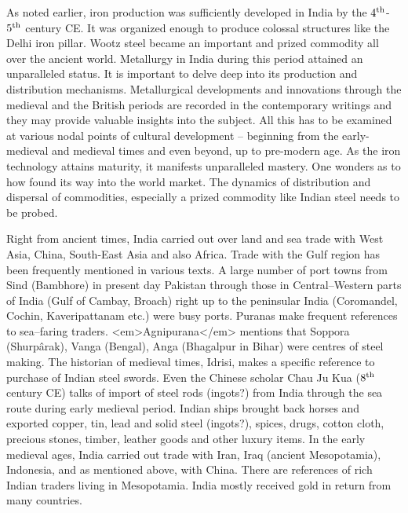As noted earlier, iron production was sufficiently developed in India by the $4^{\rm th}$-$5^{\rm th}$ century CE. It was organized enough to produce colossal structures like the Delhi iron pillar. Wootz steel became an important and prized commodity all over the ancient world. Metallurgy in India during this period attained an unparalleled status. It is important to delve deep into its production and distribution mechanisms. Metallurgical developments and innovations through the medieval and the British periods are recorded in the contemporary writings and they may provide valuable insights into the subject. All this has to be examined at various nodal points of cultural development – beginning from the early-medieval and medieval times and even beyond, up to pre-modern age. As the iron technology attains maturity, it manifests unparalleled mastery. One wonders as to how found its way into the world market. The dynamics of distribution and dispersal of commodities, especially a prized commodity like Indian steel needs to be probed.

Right from ancient times, India carried out over land and sea trade with West Asia, China, South-East Asia and also Africa. Trade with the Gulf region has been frequently mentioned in various texts. A large number of port towns from Sind (Bambhore) in present day Pakistan through those in Central–Western parts of India (Gulf of Cambay, Broach) right up to the peninsular India (Coromandel, Cochin, Kaveripattanam etc.) were busy ports. Puranas make frequent references to sea–faring traders. <em>Agnipurana</em> mentions that Soppora (Shurpârak), Vanga (Bengal), Anga (Bhagalpur in Bihar) were centres of steel making. The historian of medieval times, Idrisi, makes a specific reference to purchase of Indian steel swords. Even the Chinese scholar Chau Ju Kua ($8^{\rm th}$ century CE) talks of import of steel rods (ingots?) from India through the sea route during early medieval period. Indian ships brought back horses and exported copper, tin, lead and solid steel (ingots?), spices, drugs, cotton cloth, precious stones, timber, leather goods and other luxury items. In the early medieval ages, India carried out trade with Iran, Iraq (ancient Mesopotamia), Indonesia, and as mentioned above, with China. There are references of rich Indian traders living in Mesopotamia. India mostly received gold in return from many countries.

